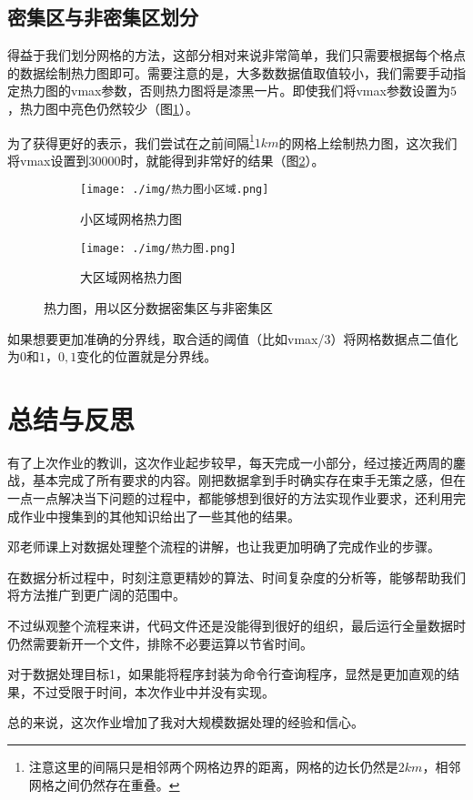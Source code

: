 \documentclass[UTF8]{ctexart}
\begin{document}
\subsection{密集区与非密集区划分}

得益于我们划分网格的方法，这部分相对来说非常简单，我们只需要根据每个格点的数据绘制热力图即可。需要注意的是，大多数数据值取值较小，我们需要手动指定热力图的vmax参数，否则热力图将是漆黑一片。即使我们将vmax参数设置为$5$，热力图中亮色仍然较少（图\ref{hotSmall}）。

为了获得更好的表示，我们尝试在之前间隔\footnote{注意这里的间隔只是相邻两个网格边界的距离，网格的边长仍然是$2km$，相邻网格之间仍然存在重叠。}$1km$的网格上绘制热力图，这次我们将vmax设置到$30000$时，就能得到非常好的结果（图\ref{hot}）。

\begin{figure}[!htb]
    \centering
    \begin{subfigure}[b]{0.49\textwidth}
        \texttt{[image: ./img/热力图小区域.png]}
        \caption{小区域网格热力图}
        \label{hotSmall}
    \end{subfigure}
    \hfill
    \begin{subfigure}[b]{0.49\textwidth}
        \texttt{[image: ./img/热力图.png]}
        \caption{大区域网格热力图}
        \label{hot}
    \end{subfigure}
    \caption{热力图，用以区分数据密集区与非密集区}
    \label{hotL}
\end{figure}

如果想要更加准确的分界线，取合适的阈值（比如vmax/3）将网格数据点二值化为$0$和$1$，$0,1$变化的位置就是分界线。

\section{总结与反思}

有了上次作业的教训，这次作业起步较早，每天完成一小部分，经过接近两周的鏖战，基本完成了所有要求的内容。刚把数据拿到手时确实存在束手无策之感，但在一点一点解决当下问题的过程中，都能够想到很好的方法实现作业要求，还利用完成作业中搜集到的其他知识给出了一些其他的结果。

邓老师课上对数据处理整个流程的讲解，也让我更加明确了完成作业的步骤。

在数据分析过程中，时刻注意更精妙的算法、时间复杂度的分析等，能够帮助我们将方法推广到更广阔的范围中。

不过纵观整个流程来讲，代码文件还是没能得到很好的组织，最后运行全量数据时仍然需要新开一个文件，排除不必要运算以节省时间。

对于数据处理目标1，如果能将程序封装为命令行查询程序，显然是更加直观的结果，不过受限于时间，本次作业中并没有实现。

总的来说，这次作业增加了我对大规模数据处理的经验和信心。
\end{document}
